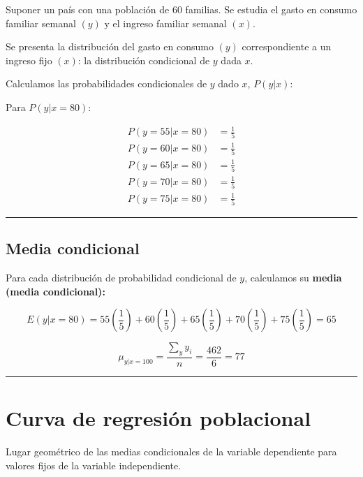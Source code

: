 \documentclass[
]{book}
\begin{document}
Suponer un país con una población de 60 familias. Se estudia el gasto en consumo familiar semanal \((y)\) y el ingreso familiar semanal \((x)\).

Se presenta la distribución del gasto en consumo \((y)\) correspondiente a un ingreso fijo \((x)\): la distribución condicional de \(y\) dada \(x\).

Calculamos las probabilidades condicionales de \(y\) dado \(x\), \(P(y|x)\):

Para \(P(y|x = 80)\):

\[ 
\begin{align*} 
P(y=55|x=80) &= \frac{1}{5} \\ 
P(y=60|x=80) &= \frac{1}{5} \\ 
P(y=65|x=80) &= \frac{1}{5} \\ 
P(y=70|x=80) &= \frac{1}{5} \\ 
P(y=75|x=80) &= \frac{1}{5} 
\end{align*} 
\]

\begin{center}\rule{0.5\linewidth}{0.5pt}\end{center}

\hypertarget{media-condicional}{%
\subsection{Media condicional}\label{media-condicional}}

Para cada distribución de probabilidad condicional de \(y\), calculamos su \textbf{media (media condicional):}

\[ 
E(y|x=80) = 55\left( \frac{1}{5} \right) + 60\left( \frac{1}{5} \right) + 65\left( \frac{1}{5} \right) + 70\left( \frac{1}{5} \right) + 75\left( \frac{1}{5} \right) = 65
\]

\[
\mu_{y|x=100} = \frac{\sum_{y}y_{i}}{n} = \frac{462}{6} = 77
\]

\begin{center}\rule{0.5\linewidth}{0.5pt}\end{center}

\hypertarget{curva-de-regresiuxf3n-poblacional}{%
\section{Curva de regresión poblacional}\label{curva-de-regresiuxf3n-poblacional}}

Lugar geométrico de las medias condicionales de la variable dependiente para valores fijos de la variable independiente.
\end{document}
